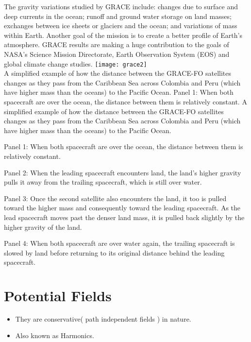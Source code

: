 \documentclass[a4paper,12pt]{article}
\begin{document}
The gravity variations studied by GRACE include: changes due to surface and deep currents in the ocean; runoff and ground water storage on land masses; exchanges between ice sheets or glaciers and the ocean; and variations of mass within Earth. Another goal of the mission is to create a better profile of Earth's atmosphere. GRACE results are making a huge contribution to the goals of NASA's Science Mission Directorate, Earth Observation System (EOS) and global climate change studies.
\newpage
\texttt{[image: grace2]}
\\
A simplified example of how the distance between the GRACE-FO satellites changes as they pass from the Caribbean Sea across Colombia and Peru (which have higher mass than the oceans) to the Pacific Ocean. Panel 1: When both spacecraft are over the ocean, the distance between them is relatively constant. 
A simplified example of how the distance between the GRACE-FO satellites changes as they pass from the Caribbean Sea across Colombia and Peru (which have higher mass than the oceans) to the Pacific Ocean.

Panel 1: When both spacecraft are over the ocean, the distance between them is relatively constant.

Panel 2: When the leading spacecraft encounters land, the land's higher gravity pulls it away from the trailing spacecraft, which is still over water.

Panel 3: Once the second satellite also encounters the land, it too is pulled toward the higher mass and consequently toward the leading spacecraft. As the lead spacecraft moves past the denser land mass, it is pulled back slightly by the higher gravity of the land.

Panel 4: When both spacecraft are over water again, the trailing spacecraft is slowed by land before returning to its original distance behind the leading spacecraft.





\newpage

\section{Potential Fields}
\begin{itemize}
\item They are conservative( path independent fields ) in nature.     
\item Also known as Harmonics.
\end{itemize}
\end{document}
